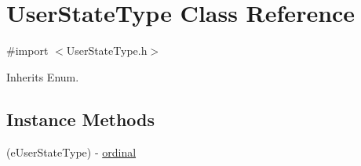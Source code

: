 \hypertarget{interface_user_state_type}{}\section{User\+State\+Type Class Reference}
\label{interface_user_state_type}


{\ttfamily \#import $<$User\+State\+Type.\+h$>$}



Inherits Enum.

\subsection*{Instance Methods}
\begin{DoxyCompactItemize}
\item 
(e\+User\+State\+Type) -\/ \hyperlink{interface_user_state_type_a9365cccfa0d3c65d5af1d761f7831daf}{ordinal}
\end{DoxyCompactItemize}
